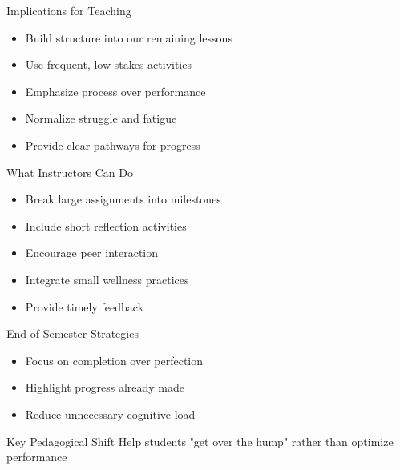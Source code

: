 \documentclass[dvipsnames]{beamer}
\begin{document}
\begin{frame}{Implications for Teaching}
\begin{itemize}
    \item Build structure into our remaining lessons 
    \item Use frequent, low-stakes activities
    \item Emphasize process over performance
\end{itemize}



\begin{itemize}
    \item Normalize struggle and fatigue
    \item Provide clear pathways for progress
\end{itemize}

\end{frame}


\begin{frame}{What Instructors Can Do}
\begin{itemize}
    \item Break large assignments into milestones
    \item Include short reflection activities
    \item Encourage peer interaction
\end{itemize}



\begin{itemize}
    \item Integrate small wellness practices
    \item Provide timely feedback
\end{itemize}

\end{frame}


\begin{frame}{End-of-Semester Strategies}
\begin{itemize}
    \item Focus on completion over perfection
    \item Highlight progress already made
    \item Reduce unnecessary cognitive load
\end{itemize}



\begin{block}{Key Pedagogical Shift}
Help students "get over the hump" rather than optimize performance
\end{block}

\end{frame}
\end{document}
